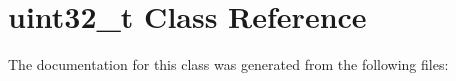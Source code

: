 \hypertarget{classuint32__t}{}\section{uint32\+\_\+t Class Reference}
\label{classuint32__t}


The documentation for this class was generated from the following files\+: